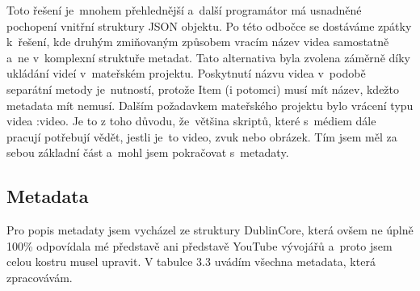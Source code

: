 \par Toto řešení je~mnohem přehlednější a~další programátor má usnadněné pochopení vnitřní struktury JSON objektu. Po této odbočce se dostáváme zpátky k~řešení, kde druhým zmiňovaným způsobem vracím název videa samostatně a~ne v~komplexní struktuře metadat. Tato alternativa byla zvolena záměrně díky ukládání videí v~mateřském projektu. Poskytnutí názvu videa v~podobě separátní metody je~nutností, protože Item (i potomci) musí mít název, kdežto metadata mít nemusí. Dalším požadavkem mateřského projektu bylo vrácení typu videa :video. Je to z toho důvodu, že~většina skriptů, které s~médiem dále pracují potřebují vědět, jestli je~to video, zvuk nebo obrázek. Tím jsem měl za sebou základní část a~mohl jsem pokračovat s~metadaty.

\subsection{Metadata}

\par Pro popis metadaty jsem vycházel ze struktury DublinCore, která ovšem ne úplně 100\% odpovídala mé představě ani představě YouTube vývojářů a~proto jsem celou kostru musel upravit. V tabulce 3.3 uvádím všechna metadata, která zpracovávám.


